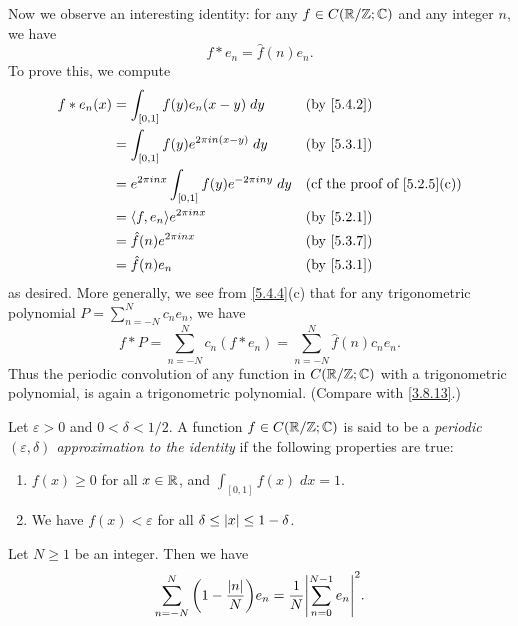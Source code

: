\begin{ac}\label{ac:5.4.1}
  Now we observe an interesting identity:
  for any \(f \in C(\mathbb{R} / \mathbb{Z} ; \mathbb{C})\) and any integer \(n\), we have
  \[
    f * e_n = \hat{f}(n) e_n.
  \]
  To prove this, we compute
  \begin{align*}
    f * e_n(x) & = \int_{[0, 1]} f(y) e_n(x - y) \; dy                        &  & \by{5.4.2}                               \\
               & = \int_{[0, 1]} f(y) e^{2 \pi i n (x - y)} \; dy             &  & \by{5.3.1}                               \\
               & = e^{2 \pi i n x} \int_{[0, 1]} f(y) e^{- 2 \pi i n y} \; dy &  & \text{(cf the proof of \cref{5.2.5}(c))} \\
               & = \inner*{f, e_n} e^{2 \pi i n x}                            &  & \by{5.2.1}                               \\
               & = \hat{f}(n) e^{2 \pi i n x}                                 &  & \by{5.3.7}                               \\
               & = \hat{f}(n) e_n                                             &  & \by{5.3.1}
  \end{align*}
  as desired.
  More generally, we see from \cref{5.4.4}(c) that for any trigonometric polynomial \(P = \sum_{n = -N}^N c_n e_n\), we have
  \[
    f * P = \sum_{n = -N}^N c_n (f * e_n) = \sum_{n = -N}^N \hat{f}(n) c_n e_n.
  \]
  Thus the periodic convolution of any function in \(C(\mathbb{R} / \mathbb{Z} ; \mathbb{C})\) with a trigonometric polynomial, is again a trigonometric polynomial.
  (Compare with \cref{3.8.13}.)
\end{ac}

\begin{defn}\label{5.4.5}
  Let \(\varepsilon > 0\) and \(0 < \delta < 1 / 2\).
  A function \(f \in C(\mathbb{R} / \mathbb{Z} ; \mathbb{C})\) is said to be a \emph{periodic \((\varepsilon, \delta)\) approximation to the identity} if the following properties are true:
  \begin{enumerate}
    \item \(f(x) \geq 0\) for all \(x \in \mathbb{R}\), and \(\int_{[0, 1]} f(x) \; dx = 1\).
    \item We have \(f(x) < \varepsilon\) for all \(\delta \leq \left\lvert x\right\rvert \leq 1 - \delta\).
  \end{enumerate}
\end{defn}

\begin{ac}\label{ac:5.4.2}
  Let \(N \geq 1\) be an integer.
  Then we have
  \[
    \sum_{n = -N}^N \bigg(1 - \dfrac{\abs{n}}{N}\bigg) e_n = \dfrac{1}{N} \abs{\sum_{n = 0}^{N - 1} e_n}^2.
  \]
\end{ac}

